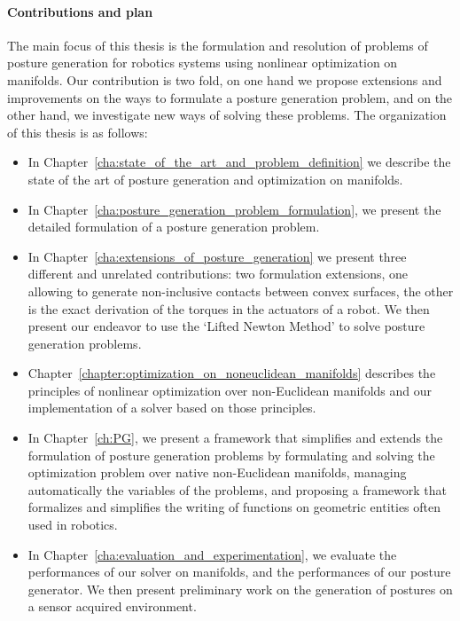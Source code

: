 \paragraph{Contributions and plan}
The main focus of this thesis is the formulation and resolution of problems of posture generation for robotics systems using nonlinear optimization on manifolds.
Our contribution is two fold, on one hand we propose extensions and improvements on the ways to formulate a posture generation problem, and on the other hand, we investigate new ways of solving these problems.
The organization of this thesis is as follows:
\begin{itemize}
  \item In Chapter~\ref{cha:state_of_the_art_and_problem_definition} we describe the state of the art of posture generation and optimization on manifolds.
  \item In Chapter~\ref{cha:posture_generation_problem_formulation}, we present the detailed formulation of a posture generation problem.
  \item In Chapter~\ref{cha:extensions_of_posture_generation} we present three different and unrelated contributions: two formulation extensions, one allowing to generate non-inclusive contacts between convex surfaces, the other is the exact derivation of the torques in the actuators of a robot.
  We then present our endeavor to use the `Lifted Newton Method' to solve posture generation problems.
  \item Chapter~\ref{chapter:optimization_on_noneuclidean_manifolds} describes the principles of nonlinear optimization over non-Euclidean manifolds and our implementation of a solver based on those principles.
  \item In Chapter~\ref{ch:PG}, we present a framework that simplifies and extends the formulation of posture generation problems by formulating and solving the optimization problem over native non-Euclidean manifolds, managing automatically the variables of the problems, and proposing a framework that formalizes and simplifies the writing of functions on geometric entities often used in robotics.
  \item In Chapter~\ref{cha:evaluation_and_experimentation}, we evaluate the performances of our solver on manifolds, and the performances of our posture generator. We then present preliminary work on the generation of postures on a sensor acquired environment.
\end{itemize}


